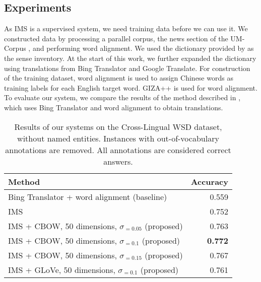 {\subsection{Experiments}

As IMS is a supervised system, we need training data before we can use it. We constructed data by processing a parallel corpus, the news section of the UM-Corpus \cite{tian2014corpus}, and performing word alignment. We used the dictionary provided by \cite{tao2014} as the sense inventory. At the start of this work, we further expanded the dictionary using translations from Bing Translator and Google Translate. For construction of the training dataset, word alignment is used to assign Chinese words as training labels for each English target word. GIZA++ \cite {och03} is used for word alignment. To evaluate our system, we compare the results of the method described in \cite{tao2014}, which uses Bing Translator and word alignment to obtain translations.


\begin{table}[ht]
	\caption{Results of our systems on the Cross-Lingual WSD dataset, without named entities. Instances with out-of-vocabulary annotations are removed. All annotations are considered correct answers.}
	\label{table:CLWSD-test-results}
	\begin{center}

			\begin{tabular}{| p{9cm}| r| }
				\hline
				Method & Accuracy \\
				\hline
				Bing Translator + 
                word alignment (baseline) & 0.559  \\
				\hline
				IMS & 0.752  \\
				\hline
                IMS + CBOW, 50 dimensions, $\sigma _{=0.05}$ (proposed) &  0.763  \\
				\hline
				IMS + CBOW, 50 dimensions, $\sigma _{=0.1}$ (proposed) & {\bf 0.772}  \\                                
                \hline
                IMS + CBOW, 50 dimensions, $\sigma _{=0.15}$ (proposed) & 0.767  \\
                \hline
                IMS + GLoVe, 50 dimensions, $\sigma _{=0.1}$ (proposed) & 0.761  \\


				\hline
			\end{tabular}

	\end{center}
\end{table}

}
